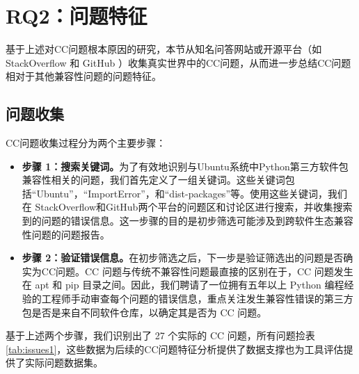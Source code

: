 \section{RQ2：问题特征}\label{3.3}
基于上述对CC问题根本原因的研究，本节从知名问答网站或开源平台（如 StackOverflow  和 GitHub ）收集真实世界中的CC问题，从而进一步总结CC问题相对于其他兼容性问题的问题特征。

\subsection{问题收集}\label{3.3.1}
CC问题收集过程分为两个主要步骤：
\begin{itemize}
	\item \textbf{步骤 1：搜索关键词。}为了有效地识别与Ubuntu系统中Python第三方软件包兼容性相关的问题，我们首先定义了一组关键词。这些关键词包括“Ubuntu”，“ImportError”，和“dist-packages”等。使用这些关键词，我们在 StackOverflow和GitHub两个平台的问题区和讨论区进行搜索，并收集搜索到的问题的错误信息。这一步骤的目的是初步筛选可能涉及到跨软件生态兼容性问题的问题报告。
	\item \textbf{步骤 2：验证错误信息。}在初步筛选之后，下一步是验证筛选出的问题是否确实为CC问题。CC 问题与传统不兼容性问题最直接的区别在于，CC 问题发生在 apt 和 pip 目录之间。因此，我们聘请了一位拥有五年以上 Python 编程经验的工程师手动审查每个问题的错误信息，重点关注发生兼容性错误的第三方包是否是来自不同软件仓库，以确定其是否为 CC 问题。
\end{itemize}
基于上述两个步骤，我们识别出了 27 个实际的 CC 问题，所有问题捡表\ref{tab:issues1}，这些数据为后续的CC问题特征分析提供了数据支撑也为工具评估提供了实际问题数据集。


